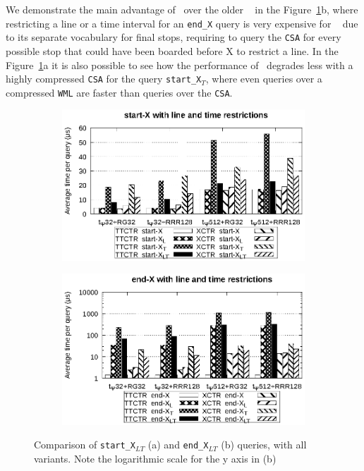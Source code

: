    We demonstrate the main advantage of \ctr~over the older \ttctr~ in the Figure~\ref{fig:start}b, where restricting a line or a time interval for an \texttt{end\_X} query is very expensive for \ttctr~ due to its separate vocabulary for final stops, requiring to query the \texttt{CSA} for every possible stop that could have been boarded before X to restrict a line. In the Figure~\ref{fig:start}a it is also possible to see how the performance of \ctr~degrades less with a highly compressed \texttt{CSA} for the query \texttt{start\_X$_T$}, where even queries over a compressed \texttt{WML} are faster than queries over the \texttt{CSA}.
    
    
    \begin{figure}[ht]
    \begin{subfigure}{0.5\linewidth}
    \includegraphics[width=\linewidth]{experiments/start.eps}
    \vspace{-12pt}
    \caption{}
    \vspace{-12pt}
    \end{subfigure}%
    \begin{subfigure}{0.5\linewidth}
    \includegraphics[width=\linewidth]{experiments/end.eps}
    \vspace{-12pt}
    \caption{}
    \vspace{-12pt}
    \end{subfigure}
    \caption{Comparison of \texttt{start\_X$_{LT}$} (a) and \texttt{end\_X$_{LT}$} (b) queries, with all variants. Note the logarithmic scale for the y axis in (b)}
    \label{fig:start}
    \end{figure}
    
